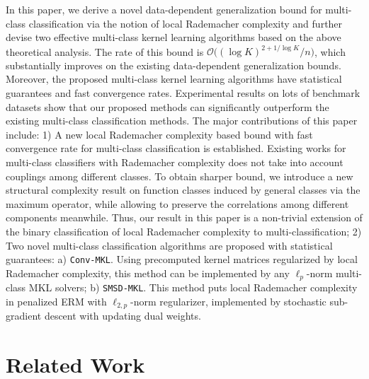 \documentclass{article}
\begin{document}
In this paper, we derive a novel data-dependent generalization bound for multi-class classification
via the notion of local Rademacher complexity and
further devise two effective multi-class kernel learning algorithms based on the above theoretical analysis.
The rate of this bound is $\mathcal{O}\big({(\log K)^{2+{1}/{\log K}}}/{n}\big)$,
which substantially improves on the existing data-dependent generalization bounds.
Moreover, the proposed multi-class kernel learning algorithms have statistical guarantees and fast convergence rates.
Experimental results on lots of benchmark datasets show that our proposed methods can significantly
outperform the existing multi-class classification methods.
The major contributions of this paper include:
 1) A new local Rademacher complexity based bound with fast convergence rate for multi-class classification is established.
   Existing works \cite{kuznetsov2014multi,mohri2012foundations} for multi-class classifiers with Rademacher complexity
   does not take into account couplings among different classes.
   To obtain sharper bound, we introduce a new structural complexity result on function classes induced by general classes via the maximum operator,
   while allowing to preserve the correlations among different components meanwhile.
   Thus, our result in this paper is a non-trivial extension of the binary classification of local Rademacher complexity to multi-classification;
 2) Two novel multi-class classification algorithms are proposed with statistical guarantees: a) \texttt{Conv-MKL}.
Using precomputed kernel matrices regularized by local Rademacher complexity,
this method can be implemented by any $\ell_p$-norm multi-class MKL solvers;
b) \texttt{SMSD-MKL}.
This method puts local Rademacher complexity
in penalized ERM with $\ell_{2,p}$-norm regularizer,
implemented by stochastic sub-gradient descent with updating dual weights.

\section{Related Work}
\end{document}
